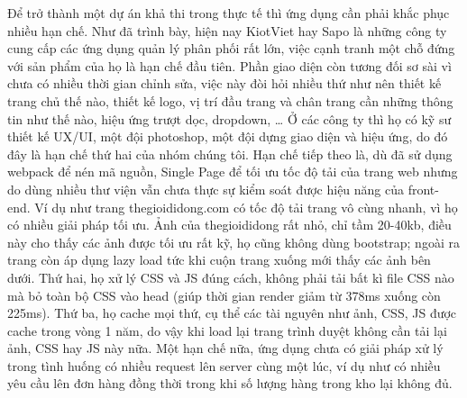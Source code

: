 Để trở thành một dự án khả thi trong thực tế thì ứng dụng cần phải
khắc phục nhiều hạn chế. Như đã trình bày, hiện nay KiotViet hay Sapo
là những công ty cung cấp các ứng dụng quản lý phân phối rất lớn,
việc cạnh tranh một chỗ đứng với sản phẩm của họ là hạn chế đầu tiên.
Phần giao diện còn tương đối sơ sài vì chưa có nhiều thời gian chỉnh sửa,
việc này đòi hỏi nhiều thứ như nên thiết kế trang chủ thế nào,
thiết kế logo, vị trí đầu trang và chân trang cần những thông tin
như thế nào, hiệu ứng trượt dọc, dropdown, … Ở các công ty thì họ có
kỹ sư thiết kế UX/UI, một đội photoshop, một đội dựng giao diện
và hiệu ứng, do đó đây là hạn chế thứ hai của nhóm chúng tôi. Hạn chế
tiếp theo là, dù đã sử dụng webpack để nén mã nguồn, Single Page
để tối ưu tốc độ tải của trang web nhưng do dùng nhiều thư viện
vẫn chưa thực sự kiểm soát được hiệu năng của front-end. Ví dụ
như trang thegioididong.com có tốc độ tải trang vô cùng nhanh,
vì họ có nhiều giải pháp tối ưu. Ảnh của thegioididong rất nhỏ,
chỉ tầm 20-40kb, điều này cho thấy các ảnh được tối ưu rất kỹ,
họ cũng không dùng bootstrap; ngoài ra trang còn áp dụng lazy load tức
khi cuộn trang xuống mới thấy các ảnh bên dưới. Thứ hai, họ xử lý
CSS và JS đúng cách, không phải tải bất kì file CSS nào mà bỏ toàn
bộ CSS vào head (giúp thời gian render giảm từ 378ms xuống còn 225ms).
Thứ ba, họ cache mọi thứ, cụ thể các tài nguyên như ảnh, CSS, JS
được cache trong vòng 1 năm, do vậy khi load lại trang trình
duyệt không cần tải lại ảnh, CSS hay JS này nữa. Một hạn
chế nữa, ứng dụng chưa có giải pháp xử lý trong tình huống có nhiều
request lên server cùng một lúc, ví dụ như có nhiều yêu cầu lên
đơn hàng đồng thời trong khi số lượng hàng trong kho lại không đủ.


